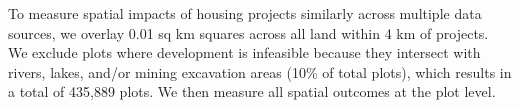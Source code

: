 \documentclass[12pt]{article}
\begin{document}





To measure spatial impacts of housing projects similarly across multiple data sources, we overlay 0.01 sq km squares across all land within 4 km of projects.  We exclude plots where development is infeasible because they intersect with rivers, lakes, and/or mining excavation areas (10\% of total plots), which results in a total of 435,889 plots.  We then measure all spatial outcomes at the plot level. 
\end{document}
